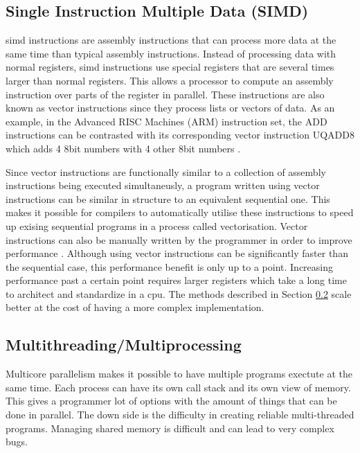 \subsection{Single Instruction Multiple Data (SIMD)} \label{simd}

\gls{simd} instructions are assembly instructions that can process more data
at the same time than typical assembly instructions. Instead of processing
data with normal registers, \gls{simd} instructions use special registers
that are several times larger than normal registers. This allows a processor
to compute an assembly instruction over parts of the register in parallel.
These instructions are also known as vector instructions since they process
lists or vectors of data. As an example, in the Advanced RISC Machines (ARM)
instruction set, the ADD instructions can be contrasted with its corresponding
vector instruction UQADD8 which adds 4 8bit numbers with 4 other 8bit numbers
\citep{noauthor_arm_nodate}.

Since vector instructions are functionally similar to a collection of assembly
instructions being executed simultaneusly, a program written using vector
instructions can be similar in structure to an equivalent sequential one. This
makes it possible for compilers to automatically utilise these instructions
to speed up exising sequential programs in a process called vectorisation.
Vector instructions can also be manually written by the programmer in order to
improve performance \cite{langdale_parsing_2019, mytkowicz_data-parallel_2014}.
Although using vector instructions can be significantly faster than the
sequential case, this performance benefit is only up to a point. Increasing
performance past a certain point requires larger registers which take a long
time to architect and standardize in a \gls{cpu}. The methods described in
Section \ref{multithreading} scale better at the cost of having a more complex
implementation.

\subsection{Multithreading/Multiprocessing} \label{multithreading}

Multicore parallelism makes it possible to have multiple programs exectute at
the same time. Each process can have its own call stack and its own view of
memory. This gives a programmer lot of options with the amount of things
that can be done in parallel. The down side is the difficulty in creating
reliable multi-threaded programs. Managing shared memory is difficult and can
lead to very complex bugs.

